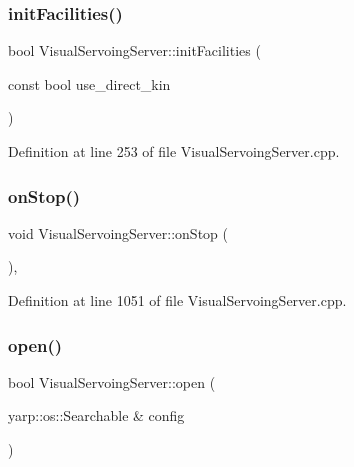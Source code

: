 \subsubsection{\texorpdfstring{init\+Facilities()}{initFacilities()}}
{\footnotesize\ttfamily bool Visual\+Servoing\+Server\+::init\+Facilities (\begin{DoxyParamCaption}\item[{const bool}]{use\+\_\+direct\+\_\+kin }\end{DoxyParamCaption})\hspace{0.3cm}{\ttfamily [override]}}



Definition at line 253 of file Visual\+Servoing\+Server.\+cpp.

\mbox{\label{classVisualServoingServer_a1401f7ee34d88728dd103439b25f9cf5}} 
\subsubsection{\texorpdfstring{on\+Stop()}{onStop()}}
{\footnotesize\ttfamily void Visual\+Servoing\+Server\+::on\+Stop (\begin{DoxyParamCaption}{ }\end{DoxyParamCaption})\hspace{0.3cm}{\ttfamily [override]}, {\ttfamily [protected]}}



Definition at line 1051 of file Visual\+Servoing\+Server.\+cpp.

\mbox{\label{classVisualServoingServer_a0698977ddac02801eba3c35b47b9aa19}} 
\subsubsection{\texorpdfstring{open()}{open()}}
{\footnotesize\ttfamily bool Visual\+Servoing\+Server\+::open (\begin{DoxyParamCaption}\item[{yarp\+::os\+::\+Searchable \&}]{config }\end{DoxyParamCaption})\hspace{0.3cm}{\ttfamily [override]}}



